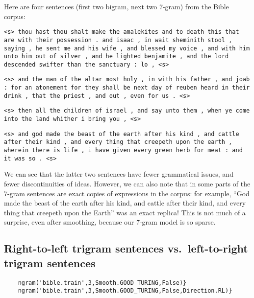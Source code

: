 \documentclass{article}
\begin{document}
\begin{adjustwidth}{0.25in}{0.5in}
\setlength{\parindent}{-0.15in}
Here are four sentences (first two bigram, next two 7-gram) from the Bible corpus:\par
{\small
\texttt{<s> thou hast thou shalt make the amalekites and to death this that are with their possession . and isaac , in wait sheminith stool , saying , he sent me and his wife , and blessed my voice , and with him unto him out of silver , and he lighted benjamite , and the lord descended swifter than the sanctuary : lo , <s>}\par
\texttt{<s> and the man of the altar most holy , in with his father , and joab : for an atonement for they shall be next day of reuben heard in their drink , that the priest , and out , even for us . <s>}\par\smallskip

\texttt{<s> then all the children of israel , and say unto them , when ye come into the land whither i bring you , <s>}\par
\texttt{<s> and god made the beast of the earth after his kind , and cattle after their kind , and every thing that creepeth upon the earth , wherein there is life , i have given every green herb for meat : and it was so . <s>}\par\smallskip
}
We can see that the latter two sentences have fewer grammatical issues, and fewer discontinuities of ideas. However, we can also note that in some parts of the 7-gram sentences are exact copies of expressions in the corpus: for example, ``God made the beast of the earth after his kind, and cattle
after their kind, and every thing that creepeth upon the Earth'' was an exact replica! This is not much of a surprise, even after smoothing, because our 7-gram model is so sparse.
\end{adjustwidth}

\subsection{Right-to-left trigram sentences vs.\ left-to-right trigram sentences}
\begin{verbatim}
    ngram('bible.train',3,Smooth.GOOD_TURING,False)}
    ngram('bible.train',3,Smooth.GOOD_TURING,False,Direction.RL)}
\end{verbatim}
\end{document}
